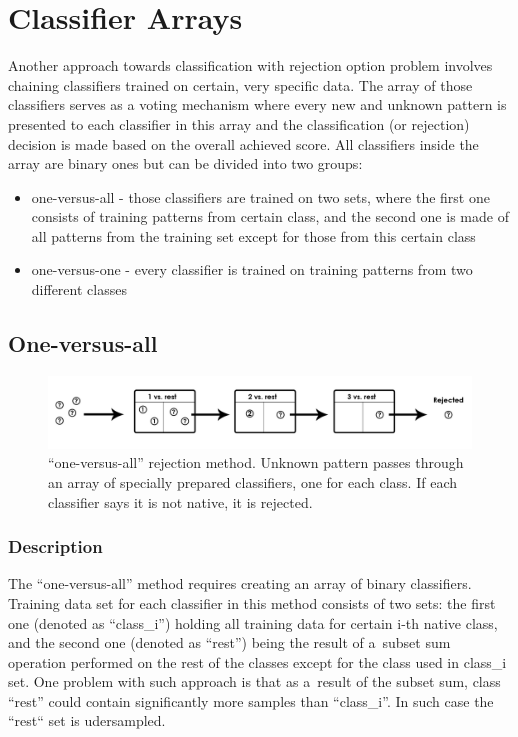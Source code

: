 \chapter{Classifier Arrays}

Another approach towards classification with rejection option problem involves chaining classifiers trained on certain, very specific data. The array of those classifiers serves as a voting mechanism where every new and unknown pattern is presented to each classifier in this array and the classification (or rejection) decision is made based on the overall achieved score. All classifiers inside the array are binary ones but can be divided into two groups:
\begin{itemize}
	\item one-versus-all - those classifiers are trained on two sets, where the first one consists of training patterns from certain class, and the second one is made of all patterns from the training set except for those from this certain class
	\item one-versus-one - every classifier is trained on training patterns from two different classes
\end{itemize}

\section{One-versus-all}

\begin{figure}[htp]
	\centering
	\includegraphics[width=1\textwidth]{Figures/classification_with_rejection1.jpg}
	\caption{``one-versus-all'' rejection method. Unknown pattern passes through an array of specially prepared classifiers, one for each class. If each classifier says it is not native, it is rejected. }
	\label{fig:rejection_version1}\vspace{-3pt}
\end{figure}

\subsection{Description}

The ``one-versus-all'' method requires creating an array of binary classifiers. Training data set for each classifier in this method consists of two sets: the first one (denoted as ``class\_i'') holding all training data for certain i-th native class, and the second one (denoted as ``rest'') being the result of a~subset sum operation performed on the rest of the classes except for the class used in class\_i set. One problem with such approach is that as a~result of the subset sum, class ``rest'' could contain significantly more samples than ``class\_i''. In such case the ``rest`` set is udersampled. 

